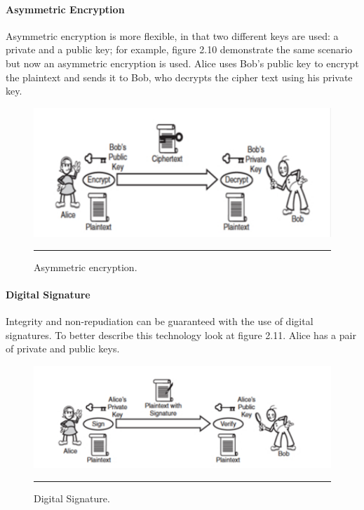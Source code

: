 \paragraph{Asymmetric Encryption}

Asymmetric encryption is more flexible, in that two different keys are used: a private and a public key; for example, figure 2.10 demonstrate the same scenario but now an asymmetric encryption is used. Alice uses Bob's public key to encrypt the plaintext and sends it to Bob, who decrypts the cipher text using his private key.

\begin{figure}[htbp]
	\centering
		\includegraphics{./Figures/figure13.pdf}
		\rule{35em}{0.5pt}
	\caption[Asymmetric Encryption]{Asymmetric encryption\cite{Graham:2001:BWS:559927}.}
	\label{fig:asymmetricEncryption}
\end{figure}

\paragraph{Digital Signature}

Integrity and non-repudiation can be guaranteed with the use of digital signatures. To better describe this technology look at figure 2.11. Alice has a pair of private and public keys.

\begin{figure}[htbp]
	\centering
		\includegraphics{./Figures/figure14.pdf}
		\rule{35em}{0.5pt}
	\caption[Digital Signature]{Digital Signature\cite{Graham:2001:BWS:559927}.}
	\label{fig:digitalSignature}
\end{figure}

